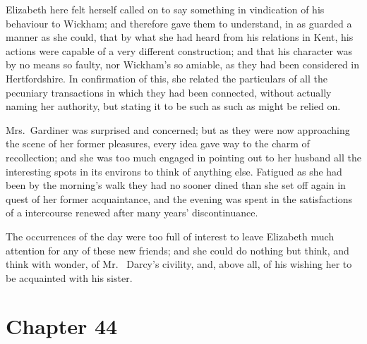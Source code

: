 Elizabeth here felt herself called on to say something in
vindication of his behaviour to Wickham; and therefore gave
them to understand, in as guarded a manner as she could, that
by what she had heard from his relations in Kent, his actions
were capable of a very different construction; and that his
character was by no means so faulty, nor Wickham's so amiable,
as they had been considered in Hertfordshire.  In confirmation
of this, she related the particulars of all the pecuniary
transactions in which they had been connected, without actually
naming her authority, but stating it to be such as such as might
be relied on.

Mrs.\ Gardiner was surprised and concerned; but as they were
now approaching the scene of her former pleasures, every idea
gave way to the charm of recollection; and she was too much
engaged in pointing out to her husband all the interesting spots
in its environs to think of anything else.  Fatigued as she had
been by the morning's walk they had no sooner dined than she
set off again in quest of her former acquaintance, and the
evening was spent in the satisfactions of a intercourse renewed
after many years' discontinuance.

The occurrences of the day were too full of interest to leave
Elizabeth much attention for any of these new friends; and she
could do nothing but think, and think with wonder, of Mr.\ %
Darcy's civility, and, above all, of his wishing her to be
acquainted with his sister.



\chapter{Chapter 44}


